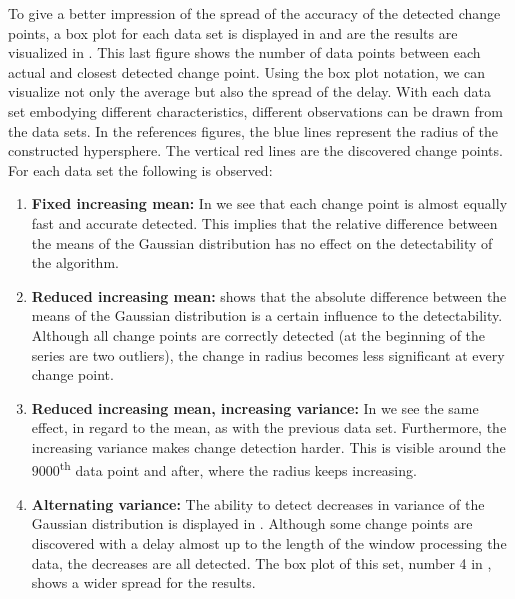 To give a better impression of the spread of the accuracy of the detected change points, a box plot for each data set is displayed in  and are the results are visualized in .
This last figure shows the number of data points between each actual and closest detected change point.
Using the box plot notation, we can visualize not only the average but also the spread of the delay.
With each data set embodying different characteristics, different observations can be drawn from the data sets.
In the references figures, the blue lines represent the radius of the constructed hypersphere.
The vertical red lines are the discovered change points.
For each data set the following is observed:
\begin{enumerate}
  \item \textbf{Fixed increasing mean:} In  we see that each change point is almost equally fast and accurate detected.
  This implies that the relative difference between the means of the Gaussian distribution has no effect on the detectability of the algorithm.
  \item \textbf{Reduced increasing mean:}  shows that the absolute difference between the means of the Gaussian distribution is a certain influence to the detectability.
  Although all change points are correctly detected (at the beginning of the series are two outliers), the change in radius becomes less significant at every change point.
  \item \textbf{Reduced increasing mean, increasing variance:} In  we see the same effect, in regard to the mean, as with the previous data set.
  Furthermore, the increasing variance makes change detection harder.
  This is visible around the $9000$\textsuperscript{th} data point and after, where the radius keeps increasing.
  \item \textbf{Alternating variance:} The ability to detect decreases in variance of the Gaussian distribution is displayed in .
  Although some change points are discovered with a delay almost up to the length of the window processing the data, the decreases are all detected.
  The box plot of this set, number 4 in , shows a wider spread for the results.
\end{enumerate}

